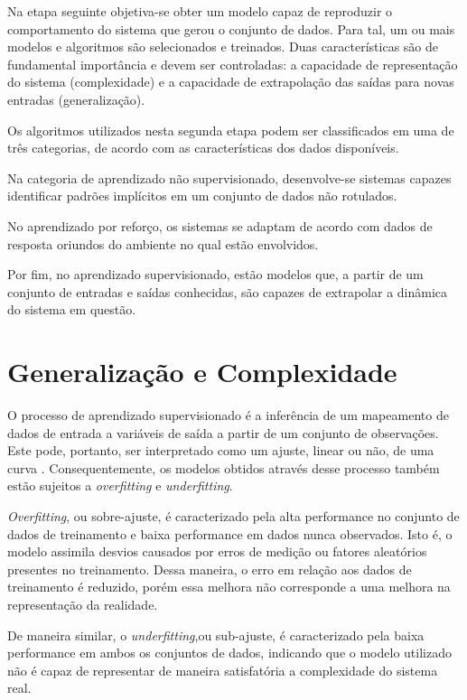 Na etapa seguinte objetiva-se obter um modelo capaz de reproduzir o comportamento do sistema que gerou o conjunto de dados. Para tal, um ou mais modelos e algoritmos são selecionados e treinados. Duas características são de fundamental importância e devem ser controladas: a capacidade de representação do sistema (complexidade) e a capacidade de extrapolação das saídas para novas entradas (generalização).

Os algoritmos utilizados nesta segunda etapa podem ser classificados em uma de três categorias, de acordo com as características dos dados disponíveis. \cite{ai_modern}

Na categoria de aprendizado não supervisionado, desenvolve-se sistemas capazes identificar padrões implícitos em um conjunto de dados não rotulados.

No aprendizado por reforço, os sistemas se adaptam de acordo com dados de resposta oriundos do ambiente no qual estão envolvidos.

Por fim, no aprendizado supervisionado, estão modelos que, a partir de um conjunto de entradas e saídas conhecidas, são capazes de extrapolar a dinâmica do sistema em questão.

\section{Generalização e Complexidade}

O processo de aprendizado supervisionado é a inferência de um mapeamento de dados de entrada a variáveis de saída a partir de um conjunto de observações. Este pode, portanto, ser interpretado como um ajuste, linear ou não, de uma curva \cite{haykin}. Consequentemente, os modelos obtidos através desse processo também estão sujeitos a \textit{overfitting} e \textit{underfitting}.

\textit{Overfitting}, ou sobre-ajuste, é caracterizado pela alta performance no conjunto de dados de treinamento e baixa performance em dados nunca observados. Isto é, o modelo assimila desvios causados por erros de medição ou fatores aleatórios presentes no treinamento. Dessa maneira, o erro em relação aos dados de treinamento é reduzido, porém essa melhora não corresponde a uma melhora na representação da realidade.

De maneira similar, o \textit{underfitting},ou sub-ajuste, é caracterizado pela baixa performance em ambos os conjuntos de dados, indicando que o modelo utilizado não é capaz de representar de maneira satisfatória a complexidade do sistema real.

